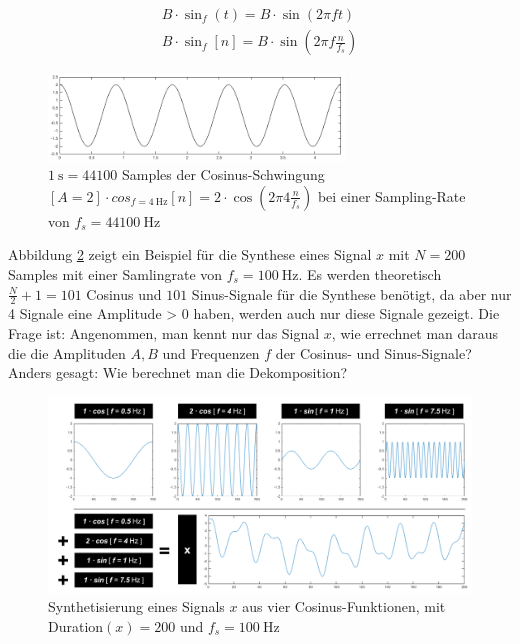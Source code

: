 \begin{equation}
\label{eq:sine}
\begin{gathered}
 B \cdot \sin_{f} (t) = B \cdot \sin(2\pi f t) \\
 B \cdot \sin_{f}[n]  = B \cdot \sin(2\pi f \frac{n}{f_s})
\end{gathered}
\end{equation}

\begin{figure}[h]
	\centering
	\includegraphics[width=0.7\textwidth]{bilder/aSimpleCosine.png}
	\caption{$\SI{1}{\second} = 44100 $ Samples der Cosinus-Schwingung $[A = 2] \cdot cos_{f=\SI{4}{\hertz}}[n] =  2 \cdot \cos(2\pi 4 \frac{n}{f_s})$ bei einer Sampling-Rate von $f_s = \SI{44100}{\hertz} $}
	\label{img:aSimpleCosine}
\end{figure}

Abbildung \ref{img:fftExample02} zeigt ein Beispiel für die Synthese eines Signal $x$ mit $N = 200$ Samples mit einer Samlingrate von $f_s = \SI{100}{\hertz}$. Es werden theoretisch $\frac{N}{2} + 1 = 101$ Cosinus und $101$ Sinus-Signale für die Synthese benötigt, da aber nur 4 Signale eine Amplitude > 0 haben, werden auch nur diese Signale gezeigt. Die Frage ist: Angenommen, man kennt nur das Signal $x$, wie errechnet man daraus die die Amplituden $A, B$ und Frequenzen $f$ der Cosinus- und Sinus-Signale? Anders gesagt: Wie berechnet man die Dekomposition?

\begin{figure}[h]
	\centering
	\includegraphics[width=1\textwidth]{bilder/fftExp02.png}
	\caption{Synthetisierung eines Signals $x$ aus vier Cosinus-Funktionen, mit Duration$(x) = 200$ und $f_s = \SI{100}{\hertz}$}
	\label{img:fftExample02}
\end{figure}

